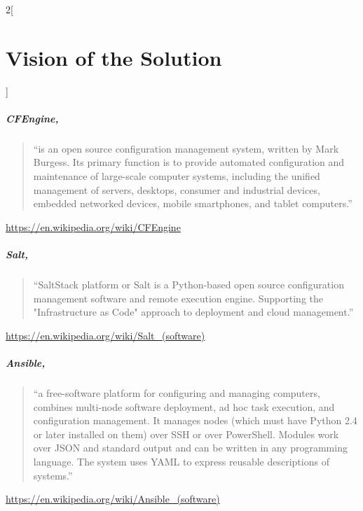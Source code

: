 \begin{multicols}{2}[\chapter{Vision of the Solution}]
\paragraph{CFEngine,}

\begin{quotation}
``is an open source configuration management system, written by Mark 
Burgess. Its primary function is to provide automated configuration and 
maintenance of large-scale computer systems, including the unified management of 
servers, desktops, consumer and industrial devices, embedded networked devices, 
mobile smartphones, and tablet computers.''
\end{quotation}
\url{https://en.wikipedia.org/wiki/CFEngine}


\paragraph{Salt,}

\begin{quotation}
``SaltStack platform or Salt is a Python-based open source configuration 
management software and remote execution engine. Supporting the "Infrastructure 
as Code" approach to deployment and cloud management.''
\end{quotation}
\url{https://en.wikipedia.org/wiki/Salt_(software)}

\paragraph{Ansible,}

\begin{quotation}
``a free-software platform for configuring and managing computers, combines 
multi-node software deployment, ad hoc task execution, and configuration 
management. It manages nodes (which must have Python 2.4 or later installed 
on them) over SSH or over PowerShell. Modules work over JSON and standard 
output and can be written in any programming language. The system uses YAML to 
express reusable descriptions of systems.''
\end{quotation}
\url{https://en.wikipedia.org/wiki/Ansible_(software)}

\end{multicols}
